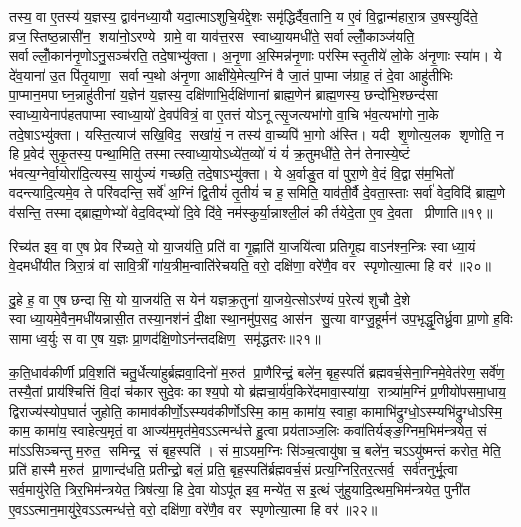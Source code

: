 तस्य॒ वा ए॒तस्य॑ य॒ज्ञस्य॒ द्वाव॑नध्या॒यौ यदा॒त्माऽशुचि॒र्यद्दे॒शः समृ॑द्धिर्दैव॒तानि॒ य ए॒वं वि॒द्वान्म॑हारा॒त्र उ॒षस्युदि॑ते॒ व्रज॒स्तिष्ठ॒न्नासी॑न॒ शया॑नो॒ऽरण्ये ग्रामे॒ वा याव॑त्त॒रस स्वाध्या॒यमधी॑ते॒ सर्वाल्लोँ॒काञ्ज॑यति॒ सर्वाल्लोँ॒कान॑नृ॒णोऽनु॒\-सञ्च॑रति॒ तदे॒षाभ्यु॑क्ता। अ॒नृ॒णा अ॒स्मिन्न॑नृ॒णाः पर॑स्मि\-स्तृ॒तीये॑ लो॒के अ॑नृ॒णाः स्या॑म। ये दे॑व॒याना॑ उ॒त पि॑तृ॒याणा॒ सर्वान्प॒थो अ॑नृ॒णा आक्षी॑ये॒मेत्य॒ग्निं वै जा॒तं पा॒प्मा ज॑ग्राह॒ तं दे॒वा आहु॑तीभिः पा॒प्मान॒मपाघ्न॒न्नाहु॑तीनां य॒ज्ञेन॑ य॒ज्ञस्य॒ दक्षि॑णाभि॒र्दक्षि॑णानां ब्राह्म॒णेन॑ ब्राह्म॒णस्य॒ छन्दो॑भि॒श्छन्द॑सा स्वाध्या॒येनाप॑हतपाप्मा स्वाध्या॒यो॑ दे॒वप॑वित्रं॒ वा ए॒तत्तं योऽनूत्सृ॒जत्यभा॑गो वा॒चि भ॑व॒त्यभा॑गो ना॒के तदे॒षाऽभ्यु॑क्ता। यस्ति॒त्याज॑ सखि॒विद॒ सखा॑यं॒ न तस्य॑ वा॒च्यपि॑ भा॒गो अ॑स्ति। यदी शृ॒णोत्य॒लक शृणोति॒ न हि प्र॒वेद॑ सुकृ॒तस्य॒ पन्था॒मिति॒ तस्मात्स्वाध्या॒योऽध्ये॑त॒व्यो॑ यं यं॑ क्र॒तुमधी॑ते॒ तेन॑ तेनास्ये॒ष्टं भ॑वत्य॒ग्नेर्वा॒योरा॑दि॒त्यस्य॒ सायु॑ज्यं गच्छति॒ तदे॒षाऽभ्यु॑क्ता। ये अ॒र्वाङु॒त वा॑ पुरा॒णे वे॒दं वि॒द्वास॑म॒भितो॑ वदन्त्यादि॒त्यमे॒व ते परि॑वदन्ति॒ सर्वे॑ अ॒ग्निं द्वि॒तीयं॑ तृ॒तीयं॑ च ह॒समिति॒ याव॑ती॒र्वै दे॒वता॒स्ताः सर्वा॑ वेद॒विदि॑ ब्राह्म॒णे व॑सन्ति॒ तस्माद्ब्राह्म॒णेभ्यो॑ वेद॒विद्भ्यो॑ दि॒वे दि॑वे॒ नम॑स्कुर्या॒न्नाश्ली॒लं कीर्तयेदे॒ता ए॒व दे॒वता प्रीणाति॥१९॥
\anuvakamend

रिच्य॑त इव॒ वा ए॒ष प्रेव रि॑च्यते॒ यो या॒जय॑ति॒ प्रति॑ वा गृ॒ह्णाति॑ या॒जयि॑त्वा प्रतिगृ॒ह्य वाऽन॑श्न॒न्त्रिः स्वाध्या॒यं वे॒दमधी॑यीत त्रिरा॒त्रं वा॑ सावि॒त्रीं गा॑य॒त्रीम॒न्वाति॑रेचयति॒ वरो॒ दक्षि॑णा॒ वरे॑णै॒व वर स्पृणोत्या॒त्मा हि वर॑॥२०॥
\anuvakamend

दु॒हे ह॒ वा ए॒ष छन्दासि॒ यो या॒जय॑ति॒ स येन॑ यज्ञक्र॒तुना॑ या॒जये॒त्सोऽर॑ण्यं प॒रेत्य॑ शुचौ दे॒शे स्वाध्या॒यमे॒वैन॒मधी॑यन्नासी॒त तस्या॒नश॑नं दी॒क्षा स्था॒नमु॑प॒सद॒ आस॑न सु॒त्या वाग्जु॒हूर्मन॑ उप॒भृद्धृ॒तिर्ध्रु॒वा प्रा॒णो ह॒विः सामाध्व॒र्युः स वा ए॒ष य॒ज्ञः प्रा॒णद॑क्षि॒णोऽन॑न्त\-दक्षिण॒ समृ॑द्धतरः॥२१॥
\anuvakamend


क॒ति॒धाव॑कीर्णी प्रवि॒शति॑ चतु॒र्धेत्या॑हुर्ब्रह्मवा॒दिनो॑ म॒रुत॑ प्रा॒णैरिन्द्रं॒ बले॑न॒ बृह॒स्पतिं॑ ब्रह्मवर्च॒सेना॒ग्निमे॒वेत॑रेण॒ सर्वे॑ण॒ तस्यै॒तां प्राय॑श्चित्तिं वि॒दां च॑कार सुदे॒वः काश्य॒पो यो ब्र॑ह्मचा॒र्य॑व॒किरे॑दमावा॒स्या॑या॒ रात्र्या॑म॒ग्निं प्र॒णीयो॑पसमा॒धाय॒ द्विराज्य॑स्योप॒घातं॑ जुहोति॒ कामाव॑कीर्णो॒ऽस्म्यव॑कीर्णोऽस्मि॒ काम॒ कामा॑य॒ स्वाहा॒ कामाभि॑द्रुग्धो॒ऽस्म्यभि॑द्रुग्धोऽस्मि॒ काम॒ कामा॑य॒ स्वाहेत्य॒मृतं॒ वा आज्य॑म॒मृत॑मे॒वऽऽत्मन्ध॑त्ते हु॒त्वा प्रय॑ताञ्ज॒लिः कवा॑तिर्यङ्ङ॒ग्निम॒भि\-म॑न्त्रयेत॒ सं मा॑ऽऽसिञ्चन्तु म॒रुत॒ समिन्द्र॒ सं बृह॒स्पति॑। सं मा॒ऽयम॒ग्निः सि॑ञ्च॒त्वायु॑षा च॒ बले॑न॒ चऽऽयु॑ष्मन्तं करोत॒ मेति॒ प्रति॑ हास्मै म॒रुत॑ प्रा॒णान्द॑धति॒ प्रतीन्द्रो॒ बलं॒ प्रति॒ बृह॒स्पति॑र्ब्रह्मवर्च॒सं प्रत्य॒ग्निरि॒तर॒त्सर्व॒ सर्व॑तनुर्भू॒त्वा सर्व॒मायु॑रेति॒ त्रिर॒भिम॑न्त्रयेत॒ त्रिष॑त्या॒ हि दे॒वा योऽपू॑त इव॒ मन्ये॑त॒ स इ॒त्थं जु॑हुयादि॒त्थम॒भिम॑न्त्रयेत॒ पुनी॑त ए॒वऽऽत्मान॒मायु॑रे॒वऽऽत्मन्ध॑त्ते॒ वरो॒ दक्षि॑णा॒ वरे॑णै॒व वर स्पृणोत्या॒त्मा हि वर॑॥२२॥
\anuvakamend

